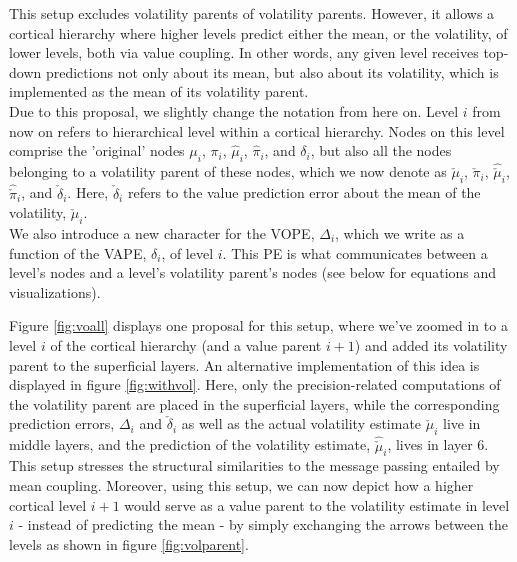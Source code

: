 This setup excludes volatility parents of volatility parents. However, it allows a cortical hierarchy where higher levels predict either the mean, or the volatility, of lower levels, both via value coupling. In other words, any given level receives top-down predictions not only about its mean, but also about its volatility, which is implemented as the mean of its volatility parent.\\

Due to this proposal, we slightly change the notation from here on. Level $i$ from now on refers to hierarchical level within a cortical hierarchy. Nodes on this level comprise the 'original' nodes $\mu_i$, $\pi_i$, $\hat{\mu}_i$, $\hat{\pi}_i$, and $\delta_i$, but also all the nodes belonging to a volatility parent of these nodes, which we now denote as $\check{\mu}_i$, $\check{\pi}_i$, $\hat{\check{\mu}}_i$, $\hat{\check{\pi}}_i$, and $\check{\delta}_i$. Here, $\check{\delta}_i$ refers to the value prediction error about the mean of the volatility, $\check{\mu}_i$. \\

We also introduce a new character for the \textsf{VOPE}, $\Delta_i$, which we write as a function of the \textsf{VAPE}, $\delta_i$, of level $i$. This PE is what communicates between a level's nodes and a level's volatility parent's nodes (see below for equations and visualizations). 


Figure \ref{fig:voall} displays one proposal for this setup, where we've zoomed in to a level $i$ of the cortical hierarchy (and a value parent $i+1$) and added its volatility parent to the superficial layers. An alternative implementation of this idea is displayed in figure \ref{fig:withvol}. Here, only the precision-related computations of the volatility parent are placed in the superficial layers, while the corresponding prediction errors, $\Delta_i$ and $\check{\delta}_i$ as well as the actual volatility estimate $\check{\mu}_i$ live in middle layers, and the prediction of the volatility estimate, $\hat{\check{\mu}}_i$, lives in layer 6. This setup stresses the structural similarities to the message passing entailed by mean coupling. Moreover, using this setup, we can now depict how a higher cortical level $i+1$ would serve as a value parent to the volatility estimate in level $i$ - instead of predicting the mean - by simply exchanging the arrows between the levels as shown in figure \ref{fig:volparent}. 

